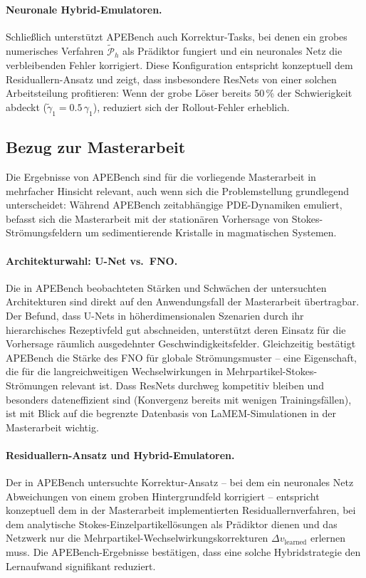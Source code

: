 \documentclass[a4paper,12pt]{article}
\begin{document}
\paragraph{Neuronale Hybrid-Emulatoren.}
Schließlich unterstützt APEBench auch Korrektur-Tasks, bei denen ein grobes numerisches Verfahren $\tilde{\mathcal{P}}_h$ als Prädiktor fungiert und ein neuronales Netz die verbleibenden Fehler korrigiert. Diese Konfiguration entspricht konzeptuell dem Residuallern-Ansatz und zeigt, dass insbesondere ResNets von einer solchen Arbeitsteilung profitieren: Wenn der grobe Löser bereits 50\,\% der Schwierigkeit abdeckt ($\tilde{\gamma}_1 = 0.5\,\gamma_1$), reduziert sich der Rollout-Fehler erheblich.

\subsection*{Bezug zur Masterarbeit}

Die Ergebnisse von APEBench sind für die vorliegende Masterarbeit in mehrfacher Hinsicht relevant, auch wenn sich die Problemstellung grundlegend unterscheidet: Während APEBench zeitabhängige PDE-Dynamiken emuliert, befasst sich die Masterarbeit mit der stationären Vorhersage von Stokes-Strömungsfeldern um sedimentierende Kristalle in magmatischen Systemen.

\paragraph{Architekturwahl: U-Net vs.\ FNO.}
Die in APEBench beobachteten Stärken und Schwächen der untersuchten Architekturen sind direkt auf den Anwendungsfall der Masterarbeit übertragbar. Der Befund, dass U-Nets in höherdimensionalen Szenarien durch ihr hierarchisches Rezeptivfeld gut abschneiden, unterstützt deren Einsatz für die Vorhersage räumlich ausgedehnter Geschwindigkeitsfelder. Gleichzeitig bestätigt APEBench die Stärke des FNO für globale Strömungsmuster -- eine Eigenschaft, die für die langreichweitigen Wechselwirkungen in Mehrpartikel-Stokes-Strömungen relevant ist. Dass ResNets durchweg kompetitiv bleiben und besonders dateneffizient sind (Konvergenz bereits mit wenigen Trainingsfällen), ist mit Blick auf die begrenzte Datenbasis von LaMEM-Simulationen in der Masterarbeit wichtig.

\paragraph{Residuallern-Ansatz und Hybrid-Emulatoren.}
Der in APEBench untersuchte Korrektur-Ansatz -- bei dem ein neuronales Netz Abweichungen von einem groben Hintergrundfeld korrigiert -- entspricht konzeptuell dem in der Masterarbeit implementierten Residuallernverfahren, bei dem analytische Stokes-Einzelpartikellösungen als Prädiktor dienen und das Netzwerk nur die Mehrpartikel-Wechselwirkungskorrekturen $\Delta v_\text{learned}$ erlernen muss. Die APEBench-Ergebnisse bestätigen, dass eine solche Hybridstrategie den Lernaufwand signifikant reduziert.
\end{document}
